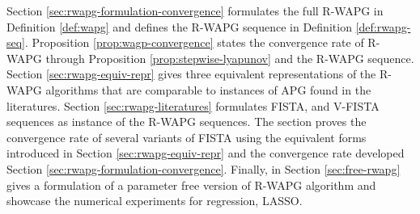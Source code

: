 \documentclass[12pt]{article}
\begin{document}
        Section \ref{sec:rwapg-formulation-convergence} formulates the full R-WAPG in Definition \ref{def:wapg} and defines the R-WAPG sequence in Definition \ref{def:rwapg-seq}. 
        Proposition \ref{prop:wagp-convergence} states the convergence rate of R-WAPG through Proposition \ref{prop:stepwise-lyapunov} and the R-WAPG sequence. 
        Section \ref{sec:rwapg-equiv-repr} gives three equivalent representations of the R-WAPG algorithms that are comparable to instances of APG found in the literatures. 
        Section \ref{sec:rwapg-literatures} formulates FISTA, and V-FISTA sequences as instance of the R-WAPG sequences.
        The section proves the convergence rate of several variants of FISTA using the equivalent forms introduced in Section \ref{sec:rwapg-equiv-repr} and the convergence rate developed Section \ref{sec:rwapg-formulation-convergence}. 
        Finally, in Section \ref{sec:free-rwapg} gives a formulation of a parameter free version of R-WAPG algorithm and showcase the numerical experiments for regression, LASSO. 

        
\end{document}
